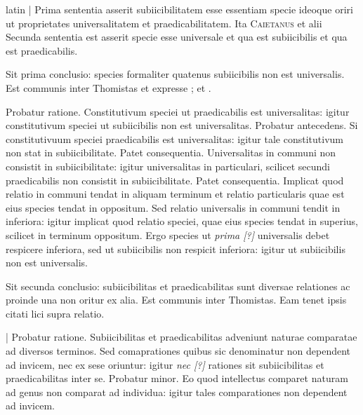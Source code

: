 \begin{otherlanguage*}{latin}
\pstart
\textnormal{|} Prima sententia asserit subiicibilitatem esse essentiam specie ideoque oriri ut proprietates universalitatem et praedicabilitatem. Ita \textsc{Caietanus} et alii Secunda sententia est  asserit specie esse universale et qua est subiicibilis et qua est praedicabilis. 
\pend

\pstart
Sit prima conclusio:
species formaliter quatenus subiicibilis non est universalis. Est communis inter Thomistas et expresse ;  et . 
\pend

\pstart
Probatur ratione. Constitutivum speciei ut praedicabilis est universalitas:
igitur constitutivum speciei ut subiicibilis non est universalitas. Probatur antecedens. Si constitutivuum speciei praedicabilis est universalitas:
igitur tale constitutivum non stat in subiicibilitate. Patet consequentia. Universalitas in communi non consistit in subiicibilitate:
igitur universalitas in particulari, scilicet secundi praedicabilis non consistit in subiicibilitate. Patet consequentia. Implicat quod relatio in communi tendat in aliquam terminum et relatio particularis quae est eius species tendat in oppositum. Sed relatio universalis in communi tendit in inferiora:
igitur implicat quod relatio speciei, quae eius species tendat in superius, scilicet in terminum oppositum. Ergo species ut \emph{prima [?]} universalis debet respicere inferiora, sed ut subiicibilis non respicit inferiora:
igitur ut subiicibilis non est universalis. 
\pend

\pstart
Sit secunda conclusio:
subiicibilitas et praedicabilitas sunt diversae relationes ac proinde una non oritur ex alia. Est communis inter Thomistas. Eam tenet   ipsis citati lici supra relatio. 
\pend

\pstart
\textnormal{|} Probatur ratione. Subiicibilitas et praedicabilitas adveniunt naturae comparatae ad diversos terminos. Sed comaprationes quibus sic denominatur non dependent ad invicem, nec ex sese oriuntur:
igitur \emph{nec [?]} rationes sit subiicibilitas et praedicabilitas inter se. Probatur minor. Eo quod intellectus comparet naturam ad genus non comparat ad individua:
igitur tales comparationes non dependent ad invicem. 
\pend


\end{otherlanguage*}
